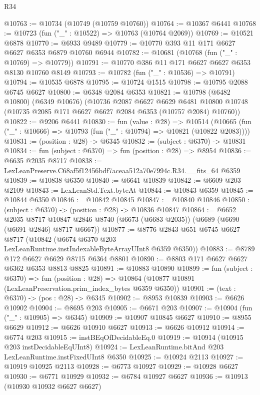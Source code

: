 \begin{lexlean}{R34}
\begin{coremodule}
@10763 := @10734 (@10749 (@10759 @10760))
@10764 := @10367 @6441
@10768 := @10723 (fun ("_" : @10522) => @10763 (@10764 @2069))
@10769 := @10521 @6878
@10770 := @6933 @9489
@10779 := @10770 @393 @11 @171 @6627 @6627 @6353 @6879 @10760 @6944
@10782 := @10681 (@10768 (fun ("_" : @10769) => @10779))
@10791 := @10770 @386 @11 @171 @6627 @6627 @6353 @8130 @10760 @8149
@10793 := @10782 (fun ("_" : @10536) => @10791)
@10794 := @10535 @6878
@10795 := @10724 @1515
@10798 := @10795 @2088 @6745 @6627
@10800 := @6348 @2084 @6353
@10821 := @10798
    (@6482 @10800)
    (@6349 @10676)
    (@10736
      @2087
      @6627
      @6629
      @6481
      @10800
      @10748
      (@10735 @2085 @171 @6627 @6627 @2084 @6353 (@10757 @2084) @10760))
@10822 := @9206 @6441
@10830 := fun (value : @28) =>
  @10514 (@10665 (fun ("_" : @10666) => @10793 (fun ("_" : @10794) => @10821 (@10822 @2083))))
@10831 := (position : @28) -> @6345
@10832 := (subject : @6370) -> @10831
@10834 := fun (subject : @6370) => fun (position : @28) => @8954
@10836 := @6635 @2035 @8717
@10838 := LexLeanPreserve.C68af5f12456bdf7aceaa512a70e7994c.R34.__fits_64 @6359
@10839 := @10838 @6350
@10840 := @6641 @10839
@10842 := @6609 @203 @2109
@10843 := LexLeanStd.Text.byteAt
@10844 := @10843 @6359
@10845 := @10844 @6350
@10846 := @10842 @10845
@10847 := @10840 @10846
@10850 := (subject : @6370) -> (position : @28) -> @10836 @10847
@10864 := @6652
    @2035
    @8717
    @10847
    @2846
    @8740
    (@6673 (@6683 @2035))
    (@6689 (@6690 (@6691 @2846) @8717 @6667))
@10877 := @8776
    @2843
    @651
    @6745
    @6627
    @8717
    (@10842 (@6674 @6370 @203 LexLeanRuntime.instIndexableByteArrayUInt8 @6359 @6350))
@10883 := @8789 @172 @6627 @6629 @8715 @6364 @8801
@10890 := @8803 @171 @6627 @6627 @6362 @6353 @8813 @8825
@10891 := @10883 @10890
@10899 := fun (subject : @6370) =>
  fun (position : @28) => @10864 (@10877 @10891 (LexLeanPreservation.prim_index_bytes @6359 @6350))
@10901 := (text : @6370) -> (pos : @28) -> @6345
@10902 := @8953 @10839
@10903 := @6626 @10902
@10904 := @8695 @203
@10905 := @6671 @203
@10907 := @10904 (fun ("_" : @10905) => @6345)
@10909 := @10907 @10845 @6627
@10910 := @8955 @6629
@10912 := @6626 @10910 @6627
@10913 := @6626 @10912
@10914 := @6774 @203
@10915 := instBEqOfDecidableEq.{0}
@10919 := @10914 (@10915 @203 instDecidableEqUInt8)
@10924 := LexLeanRuntime.bitAnd @203 LexLeanRuntime.instFixedUInt8 @6350
@10925 := @10924 @2113
@10927 := @10919 @10925 @2113
@10928 := @6773 @10927
@10929 := @10928 @6627
@10930 := @6771 @10929
@10932 := @6784 @10927 @6627
@10936 := @10913 (@10930 @10932 @6627 @6627)

\end{coremodule}
\end{lexlean}
